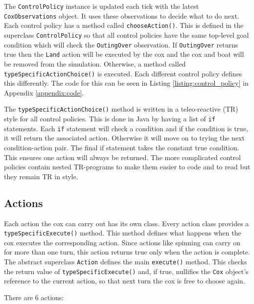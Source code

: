   The \texttt{ControlPolicy} instance is updated each tick with the latest \texttt{CoxObservations} object. It uses these observations to decide what to do next.  Each control policy has a method called \texttt{chooseAction()}. This is defined in the superclass \texttt{ControlPolicy} so that all control policies have the same top-level goal condition which will check the \texttt{OutingOver} observation. If \texttt{OutingOver} returns true then the \texttt{Land} action will be executed by the cox and the cox and boat will be removed from the simulation. Otherwise, a method called \texttt{typeSpecificActionChoice()} is executed. Each different control policy defines this differently. The code for this can be seen in Listing \ref{listing:control_policy} in Appendix \ref{appendix:code}.
  
  The \texttt{typeSpecificActionChoice()} method is written in a teleo-reactive (TR) style for all control policies. This is done in Java by having a list of \texttt{if} statements. Each \texttt{if} statement will check a condition and if the condition is true, it will return the associated action. Otherwise it will move on to trying the next condition-action pair. The final if statement takes the constant true condition. This ensures one action will always be returned. The more complicated control policies contain nested TR-programs to make them easier to code and to read but they remain TR in style. 
  
\subsection{Actions}
  Each action the cox can carry out has its own class. Every action class provides a \texttt{typeSpecificExecute()} method. This method defines what happens when the cox executes the corresponding action. Since actions like spinning can carry on for more than one turn, this action returns true only when the action is complete. The abstract superclass \texttt{Action} defines the main \texttt{execute()} method. This checks the return value of \texttt{typeSpecificExecute()} and, if true, nullifies the \texttt{Cox} object's reference to the current action, so that next turn the cox is free to choose again.

  There are 6 actions:
  
